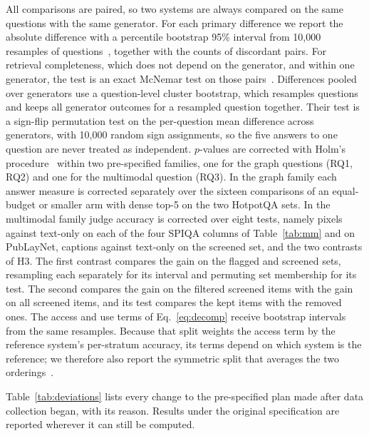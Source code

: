 \documentclass[preprint,12pt]{elsarticle}
\begin{document}
All comparisons are paired, so two systems are always compared on the same
questions with the same generator. For each primary difference we report the absolute
difference with a percentile bootstrap 95\% interval from 10{,}000
resamples of questions~\cite{efron1993bootstrap}, together with the counts of
discordant pairs. For retrieval completeness, which does not depend on the
generator, and within one generator, the test is an exact McNemar test on
those pairs~\cite{mcnemar1947}. Differences pooled over generators use a
question-level cluster bootstrap, which resamples questions and keeps all
generator outcomes for a resampled question together. Their test is a
sign-flip permutation test on the per-question mean difference across
generators, with 10{,}000 random sign assignments, so the five answers to one
question are never treated as independent. $p$-values are corrected with Holm's procedure~\cite{holm1979} within two
pre-specified families, one for the graph questions (RQ1, RQ2) and one for the
multimodal question (RQ3). In the graph family each answer measure is corrected
separately over the sixteen comparisons of an equal-budget or smaller arm with
dense top-5 on the two HotpotQA sets. In the multimodal family judge accuracy is
corrected over eight tests, namely pixels against text-only on each of the four
SPIQA columns of Table~\ref{tab:mm} and on PubLayNet, captions against text-only
on the screened set, and the two contrasts of H3. The first contrast compares
the gain on the flagged and screened sets, resampling each separately for its
interval and permuting set membership for its test. The second compares the gain
on the filtered screened items with the gain on all screened items, and its test
compares the kept items with the removed ones. The access and use terms of Eq.~\eqref{eq:decomp}
receive bootstrap intervals from the same resamples. Because that split
weights the access term by the reference system's per-stratum accuracy, its
terms depend on which system is the reference; we therefore also report the
symmetric split that averages the two orderings~\cite{kitagawa1955components}.

Table~\ref{tab:deviations} lists every change to the pre-specified plan made
after data collection began, with its reason. Results under the original
specification are reported wherever it can still be computed.
\end{document}
